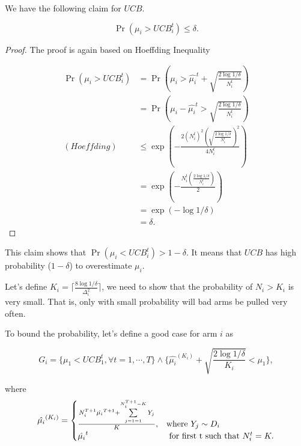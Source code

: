 \documentclass[../main.tex]{subfiles}
\begin{document}
	We have the following claim for $UCB$.
	
	\begin{claim}\label{UCB_claim_1}
		\begin{equation}
			\Pr(\mu_i > UCB_i^t) \leq \delta.
		\end{equation}
	\end{claim}

	\begin{proof}
		The proof is again based on Hoeffding Inequality
		
		\begin{equation*}
			\begin{aligned}
					\Pr(\mu_i > UCB_i^t) & = \Pr(\mu_i >\hat{\mu_i}^t + \sqrt{\frac{2\log 1 /\delta}{N_i^t}}) \\
										 & = \Pr(\mu_i - \hat{\mu_i}^t > \sqrt{\frac{2\log 1 /\delta}{N_i^t}}) \\
									(Hoeffding)&  \leq \exp(-\frac{2(N_i^t)^2 (\sqrt{\frac{2\log 1 /\delta}{N_i^t}})^2 }{4N_i^t } )\\
									& = \exp(-\frac{N_i^t (\frac{2\log 1 /\delta}{N_i^t}) }{2 }) \\
									& = \exp(-\log 1 /\delta )\\
									& = \delta.
			\end{aligned}
		\end{equation*}
	\end{proof}

	This claim shows that $	\Pr(\mu_i < UCB_i^t) > 1- \delta$. It means that $UCB$ has high probability ($1-\delta$) to overestimate $\mu_i$.
	
	Let's define $K_i = \lceil \frac{8 \log 1 / \delta}{\Delta_i^2} \rceil$, we need to show that the probability of $N_i > K_i$ is very small. That is, only with small probability will bad arms be pulled very often.
	
	To bound the probability, let's define a good case for arm $i$ as
	
	\begin{equation*}
		G_i = \{ \mu_1 < UCB_1^t, \forall t = 1,\cdots, T\} \wedge \{\hat{\mu_i}^{(K_i)} + \sqrt{\frac{2\log 1/ \delta}{K_i}} < \mu_1 \},
	\end{equation*}
	
	where
	\begin{equation*}
	\hat{\mu_i}^{(K_i)} = 
	\begin{cases}
	\frac{N_i^{T+1} \hat{\mu_i}^{T+1} + \sum\limits_{j=1=1}^{N_i^{T+1} - K} Y_j}{K}, & \textmd{where } Y_j \sim D_i \\
	\hat{\mu_i}^t &\textmd{ for first t such that } N_i^t = K.
	\end{cases}
	\end{equation*}
	
\end{document}
